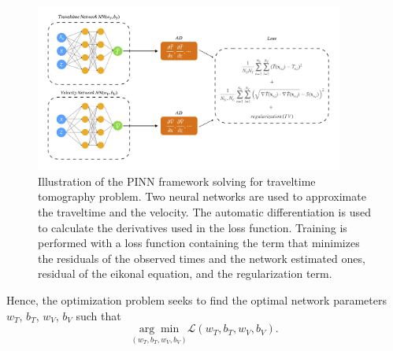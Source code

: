 \begin{figure}
 \centering
 \includegraphics[width=0.9\textwidth]{figures/chap03_pinn_enabled/pinn_schematic} 
 \caption{Illustration of the PINN framework solving for traveltime tomography problem. Two neural networks are used to approximate the traveltime and the velocity. The automatic differentiation is used to calculate the derivatives used in the loss function. Training is performed with a loss function containing the term that minimizes the residuals of the observed times and the network estimated ones, residual of the eikonal equation, and the regularization term.}
 \label{fig:pinn_schematic}
\end{figure}

Hence, the optimization problem seeks to find the optimal network parameters $w_{T}$, $b_{T}$, $w_{V}$, $b_{V}$ such that
\begin{equation}
    \label{eqn:argmin}
    \underset{(w_{T},b_{T},w_{V},b_{V})}{\arg\min} \mathcal{L}(w_{T},b_{T},w_{V},b_{V}).
\end{equation}